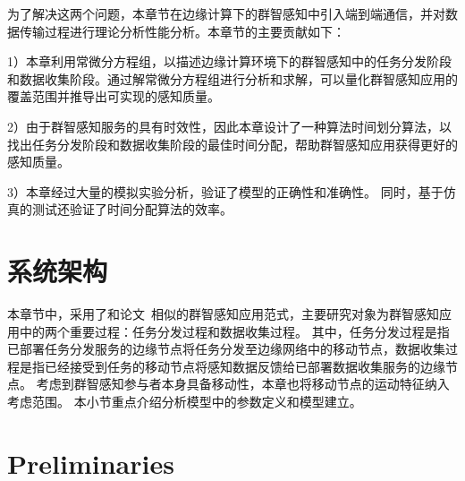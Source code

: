 为了解决这两个问题，本章节在边缘计算下的群智感知中引入端到端通信，并对数据传输过程进行理论分析性能分析。本章节的主要贡献如下：

1）本章利用常微分方程组，以描述边缘计算环境下的群智感知中的任务分发阶段和数据收集阶段。通过解常微分方程组进行分析和求解，可以量化群智感知应用的覆盖范围并推导出可实现的感知质量。

2）由于群智感知服务的具有时效性，因此本章设计了一种算法时间划分算法，以找出任务分发阶段和数据收集阶段的最佳时间分配，帮助群智感知应用获得更好的感知质量。

3）本章经过大量的模拟实验分析，验证了模型的正确性和准确性。
同时，基于仿真的测试还验证了时间分配算法的效率。

\section{系统架构}


本章节中，采用了和论文~\cite{DBLP:journals/tpds/ZhaoMTL15}相似的群智感知应用范式，主要研究对象为群智感知应用中的两个重要过程：任务分发过程和数据收集过程。
其中，任务分发过程是指已部署任务分发服务的边缘节点将任务分发至边缘网络中的移动节点，数据收集过程是指已经接受到任务的移动节点将感知数据反馈给已部署数据收集服务的边缘节点。
考虑到群智感知参与者本身具备移动性，本章也将移动节点的运动特征纳入考虑范围。
本小节重点介绍分析模型中的参数定义和模型建立。

\section{Preliminaries}


